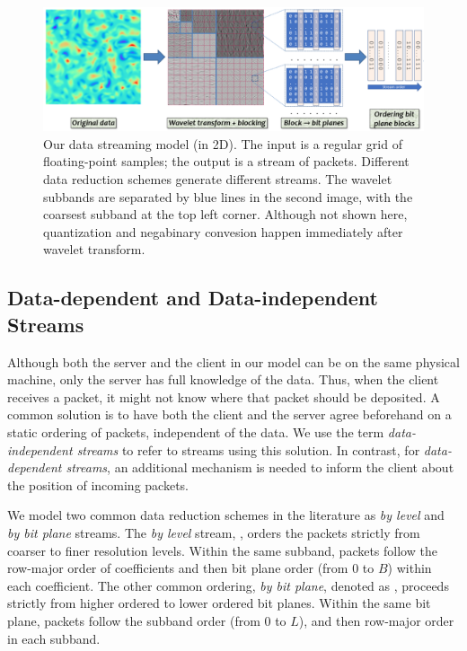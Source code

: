 \begin{figure}[h]
\centering
\includegraphics[width=\linewidth]{img/pipeline.png}
\caption{Our data streaming model (in 2D). The input is a regular grid of floating-point samples;
the output is a stream of packets. Different data reduction schemes generate different streams.  The
wavelet subbands are separated by blue lines in the second image, with the coarsest subband at the
top left corner. Although not shown here, quantization and negabinary convesion happen immediately
after wavelet transform. }\label{fig:pipeline}
\end{figure}

\subsection{Data-dependent and Data-independent Streams} \label{sec:static-dynamic-streams}

Although both the server and the client in our model can be on the same physical machine, only the
server has full knowledge of the data. Thus, when the client receives a packet, it might not know
where that packet should be deposited. A common solution is to have both the client and the server
agree beforehand on a static ordering of packets, independent of the data. We use the term
\emph{data-independent streams} to refer to streams using this solution. In contrast, for
\emph{data-dependent streams}, an additional mechanism is needed to inform the client about the
position of incoming packets.

We model two common data reduction schemes in the literature as \emph{by level} and \emph{by bit
plane} streams. The \emph{by level} stream, \slvl, orders the packets strictly from coarser to finer
resolution levels. Within the same subband, packets follow the row-major order of coefficients and
then bit plane order (from 0 to $B$) within each coefficient. The other common ordering, \emph{by
bit plane}, denoted as \sbit, proceeds strictly from higher ordered to lower ordered bit planes.
Within the same bit plane, packets follow the subband order (from 0 to $L$), and then row-major
order in each subband.

